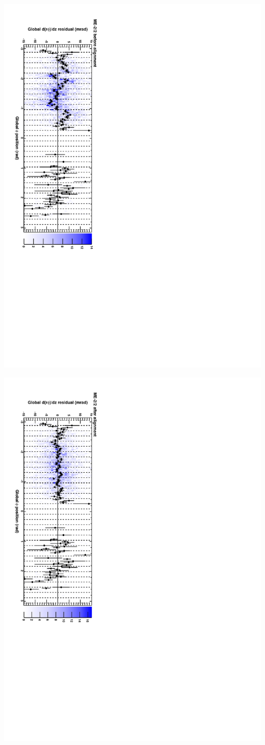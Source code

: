 \documentclass[compress]{beamer}
\begin{document}
\begin{frame}
\includegraphics[height=\linewidth, angle=90]{cscphiy_mem22_before.pdf}

\includegraphics[height=\linewidth, angle=90]{cscphiy_mem22_after.pdf}
\end{frame}
\end{document}
